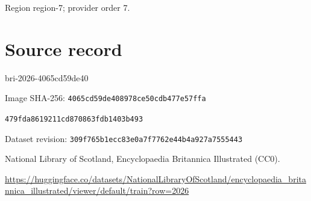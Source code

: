 \documentclass[11pt]{article}
\begin{document}
{\scriptsize\color{gray} Region region-7; provider order 7.\par}
\medskip
\newpage\section*{Source record}
bri-2026-4065cd59de40\par
Image SHA-256: \texttt{4065cd59de408978ce50cdb477e57ffa}\par\texttt{479fda8619211cd870863fdb1403b493}\par
Dataset revision: \texttt{309f765b1ecc83e0a7f7}\texttt{762e44b4a927a7555443}\par
National Library of Scotland, Encyclopaedia Britannica Illustrated (CC0).\par
\url{https://huggingface.co/datasets/NationalLibraryOfScotland/encyclopaedia_britannica_illustrated/viewer/default/train?row=2026}
\end{document}
